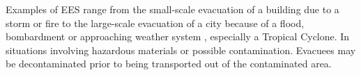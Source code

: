 \begin{poster}
{%


Examples of \ac{EES} range from the small-scale evacuation of a building due to a storm or fire to the large-scale evacuation of a city because of a flood,
	bombardment or approaching weather system \cite{ling_li_qos-aware_2014},
	especially a Tropical Cyclone.
In situations involving hazardous materials or possible contamination.
Evacuees may be decontaminated prior to being transported out of the contaminated area.
}




\end{poster}
